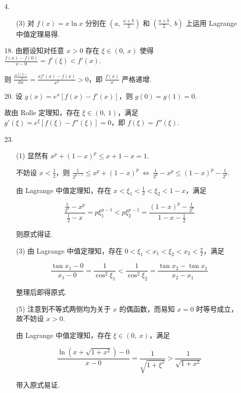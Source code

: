 \documentclass[oneside]{ctexbook} %
\begin{document}
\begin{enumerate}
    \item[4.]
    \begin{enumerate}
        \item[(3)]
        对 $f(x) = x \ln x$ 分别在 $\left( a,\ \frac {a+b} 2 \right)$ 和 $\left( \frac {a+b} 2,\ b \right)$ 上运用 Lagrange 中值定理易得.
    \end{enumerate}
    \item[18.]
    由题设知对任意 $x>0$ 存在 $\xi \in (0,\ x)$ 使得 $\frac{f(x)-f(0)}{x-0} = f'(\xi) < f'(x)$.
    
    则 $\frac{\mathrm d \frac{f(x)}{x}}{\mathrm dx} = \frac{xf'(x)-f(x)}{x^2} > 0$，即 $\frac{f(x)}{x}$ 严格递增.
    \item[20.]
    设 $g(x)=e^x\left[ f(x)-f'(x) \right]$，则 $g(0) = g(1) = 0$.
    
    故由 Rolle 定理知，存在 $\xi \in (0,\ 1)$，满足 $g'(\xi) = e^{\xi}\left[ f(\xi) - f''(\xi) \right] = 0$，即 $f(\xi) = f''(\xi)$.
    \item[23.]
    \begin{enumerate}
        \item[(1)]
        显然有 $x^p + (1-x)^p \leqslant x + 1-x = 1$.
        
        不妨设 $x < \frac 1 2$，则 $\displaystyle \frac 1 {2^{p-1}} \leqslant x^p + (1-x)^p \ \Leftrightarrow \ \frac 1 {2^p} - x^p \leqslant (1-x)^p - \frac 1 {2^p}$.
        
        由 Lagrange 中值定理知，存在 $x < \xi_1 < \frac 1 2 < \xi_2 < 1-x$，满足
        
        $$
        \frac{\frac 1 {2^p} - x^p}{\frac 1 2 - x} = p\xi_1^{p-1} < p\xi_2^{p-1} = \frac{(1-x)^p - \frac 1 {2^p}}{1-x-\frac 1 2}
        $$
        
        则原式得证.
        \item[(3)]
        由 Lagrange 中值定理知，存在 $0 < \xi_1 < x_1 < \xi_2 < x_2 < \frac \pi 2$，满足
        
        $$
        \frac{\tan x_1-0}{x_1-0} = \frac 1 {\cos^2 \xi_1} < \frac 1 {\cos^2 \xi_2} = \frac{\tan x_2 - \tan x_1}{x_2 - x_1}
        $$
        
        整理后即得原式.
        \item[(5)]
        注意到不等式两侧均为关于 $x$ 的偶函数，而易知 $x = 0$ 时等号成立，故不妨设 $x > 0$.
        
        由 Lagrange 中值定理知，存在 $\xi \in (0,\ x)$，满足
        
        $$
        \frac{\ln\left( x+\sqrt{1+x^2} \right)-0}{x-0} = \frac 1 {\sqrt{1+\xi^2}} > \frac 1 {\sqrt{1+x^2}}
        $$
        
        带入原式易证.
    \end{enumerate}
\end{enumerate}
\end{document}

